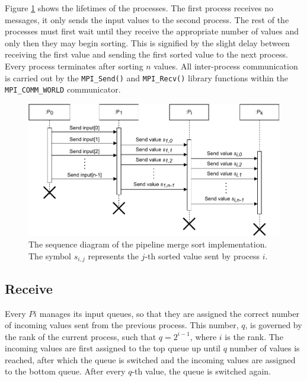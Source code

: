 \documentclass[pdftex, 11pt, a4paper, titlepage]{article}
\begin{document}
        Figure \ref{sequence_diagram} shows the lifetimes of the processes. The first process receives no messages,
        it only sends the input values to the second process. The rest of the processes must first wait until they
        receive the appropriate number of values and only then they may begin sorting. This is signified by the slight delay
        between receiving the first value and sending the first sorted value to the next process. Every process terminates
        after sorting $n$ values. All inter-process communication is carried out by the \texttt{MPI\_Send()} and \texttt{MPI\_Recv()}
        library functions within the \texttt{MPI\_COMM\_WORLD} communicator.

        \begin{figure}[h]
            \centering
            \includegraphics[scale=0.8]{sequence_diagram.pdf}
            \caption{The sequence diagram of the pipeline merge sort implementation. The symbol $s_{i,j}$ represents
            the $j$-th sorted value sent by process $i$.}
            \label{sequence_diagram}
        \end{figure}

        \subsection{Receive} \label{receive}
        Every $Pi$ manages its input queues,
        so that they are assigned the correct number of incoming values sent from the previous process. This number, $q$, is
        governed by the rank of the current process, such that $q = 2^{i-1}$, where $i$ is the rank. The incoming values are first
        assigned to the top queue up until $q$ number of values is reached, after which the queue is switched and the incoming values are
        assigned to the bottom queue. After every $q$-th value, the queue is switched again.
\end{document}

